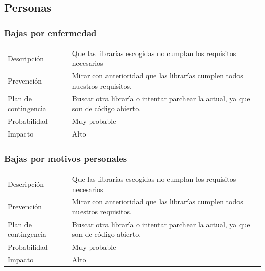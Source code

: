\subsection{Personas}
\subsubsection{Bajas por enfermedad}
\begin{table}[h]
    \begin{center}
        \begin{tabular}{l p{8cm}}
            Descripci\'{o}n                 & Que las librar\'{i}as escogidas no cumplan los requisitos necesarios \\
            Prevenci\'{o}n                  & Mirar con anterioridad que las librar\'{i}as cumplen todos nuestros requisitos. \\ 
            Plan de contingencia            & Buscar otra librar\'{i}a o intentar parchear la actual, ya que son de c\'{o}digo abierto. \\
            Probabilidad                    & Muy probable \\
            Impacto                         & Alto \\
        \end{tabular}
    \end{center}
    
\end{table}

\subsubsection{Bajas por motivos personales}
\begin{table}[h]
    \begin{center}
        \begin{tabular}{l p{8cm}}
            Descripci\'{o}n                 & Que las librar\'{i}as escogidas no cumplan los requisitos necesarios \\
            Prevenci\'{o}n                  & Mirar con anterioridad que las librar\'{i}as cumplen todos nuestros requisitos. \\ 
            Plan de contingencia            & Buscar otra librar\'{i}a o intentar parchear la actual, ya que son de c\'{o}digo abierto. \\
            Probabilidad                    & Muy probable \\
            Impacto                         & Alto \\
        \end{tabular}
    \end{center}
    
\end{table}

